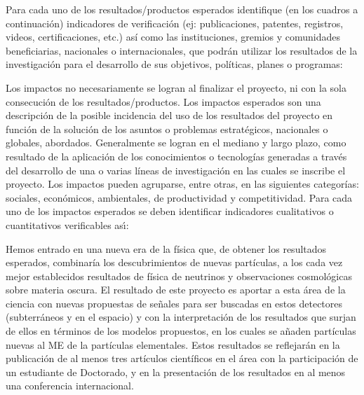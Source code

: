 \begin{instrucciones}
  Para cada uno de los resultados/productos esperados identifique (en
  los cuadros a continuación) indicadores de verificación (ej:
  publicaciones, patentes, registros, videos, certificaciones, etc.)
  así como las instituciones, gremios y comunidades beneficiarias,
  nacionales o internacionales, que podrán utilizar los resultados de
  la investigación para el desarrollo de sus objetivos, políticas,
  planes o programas:

\end{instrucciones}

\begin{instrucciones}
  Los impactos no necesariamente se logran al finalizar el proyecto, ni
con la sola consecución de los resultados/productos. Los impactos
esperados son una descripción de la posible incidencia del uso de los
resultados del proyecto en función de la solución de los asuntos o
problemas estratégicos, nacionales o globales, abordados. Generalmente
se logran en el mediano y largo plazo, como resultado de la aplicación
de los conocimientos o tecnologías generadas a través del desarrollo
de una o varias líneas de investigación en las cuales se inscribe el
proyecto. Los impactos pueden agruparse, entre otras, en las
siguientes categorías: sociales, económicos, ambientales, de
productividad y competitividad. Para cada uno de los impactos
esperados se deben identificar indicadores cualitativos o
cuantitativos verificables as\'\i:
\end{instrucciones}


Hemos entrado en una nueva era de la física que, de obtener los
resultados esperados, combinaría los descubrimientos de nuevas
partículas, a los cada vez mejor establecidos resultados de física de
neutrinos y observaciones cosmológicas sobre materia oscura. El
resultado de este proyecto es aportar a esta área de la ciencia con
nuevas propuestas de señales para ser buscadas en estos detectores
(subterráneos y en el espacio) y con la interpretación de los
resultados que surjan de ellos en términos de los modelos propuestos,
en los cuales se añaden partículas nuevas al ME de la
partículas elementales. Estos resultados se reflejarán en la
publicación de al menos tres artículos científicos en el área con la
participación de un estudiante de Doctorado, y en la presentación de
los resultados en al menos una conferencia internacional.


